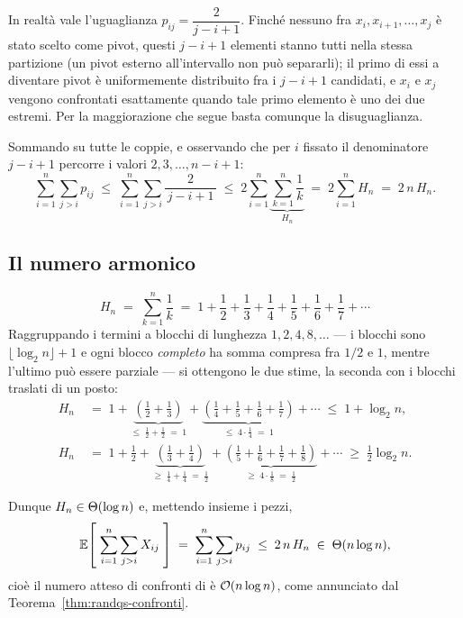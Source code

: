 \begin{osservazione}
In realtà vale l'uguaglianza $p_{ij} = \dfrac{2}{j-i+1}$. Finché nessuno fra
$x_i, x_{i+1},\dots,x_j$ è stato scelto come pivot, questi $j-i+1$ elementi
stanno tutti nella stessa partizione (un pivot esterno all'intervallo non può
separarli); il primo di essi a diventare pivot è uniformemente distribuito fra i
$j-i+1$ candidati, e $x_i$ e $x_j$ vengono confrontati esattamente quando tale
primo elemento è uno dei due estremi. Per la maggiorazione che segue basta
comunque la disuguaglianza.
\end{osservazione}

Sommando su tutte le coppie, e osservando che per $i$ fissato il denominatore
$j-i+1$ percorre i valori $2,3,\dots,n-i+1$:
\[
  \sum_{i=1}^{n}\sum_{j>i} p_{ij}
  \;\le\; \sum_{i=1}^{n}\sum_{j>i} \frac{2}{\,j-i+1\,}
  \;\le\; 2\sum_{i=1}^{n} \underbrace{\sum_{k=1}^{n}\frac{1}{k}}_{H_n}
  \;=\; 2\sum_{i=1}^{n} H_n
  \;=\; 2\,n\,H_n .
\]

\subsection{Il numero armonico}
\label{sec:numero-armonico}

\[
  H_n \;=\; \sum_{k=1}^{n}\frac1k
  \;=\; 1+\frac12+\frac13+\frac14+\frac15+\frac16+\frac17+\cdots
\]
Raggruppando i termini a blocchi di lunghezza $1,2,4,8,\dots$ --- i blocchi sono
$\lfloor\log_2 n\rfloor+1$ e ogni blocco \emph{completo} ha somma compresa fra
$1/2$ e $1$, mentre l'ultimo può essere parziale --- si ottengono le due stime,
la seconda con i blocchi traslati di un posto:
\begin{align*}
  H_n &\;=\; 1
    + \underbrace{\left(\frac12+\frac13\right)}_{\le\;\frac12+\frac12\;=\;1}
    + \underbrace{\left(\frac14+\frac15+\frac16+\frac17\right)}_{\le\;4\cdot\frac14\;=\;1}
    + \cdots \;\le\; 1+\log_2 n, \\[6pt]
  H_n &\;=\; 1+\frac12
    + \underbrace{\left(\frac13+\frac14\right)}_{\ge\;\frac14+\frac14\;=\;\frac12}
    + \underbrace{\left(\frac15+\frac16+\frac17+\frac18\right)}_{\ge\;4\cdot\frac18\;=\;\frac12}
    + \cdots \;\ge\; \frac12\log_2 n .
\end{align*}

Dunque $H_n \in \Theta(\log n)$ e, mettendo insieme i pezzi,
\[
  \mathbb{E}\!\left[\;\sum_{i=1}^{n}\sum_{j>i} X_{ij}\;\right]
  \;=\; \sum_{i=1}^{n}\sum_{j>i} p_{ij}
  \;\le\; 2\,n\,H_n \;\in\; \Theta(n\log n),
\]
cioè il numero atteso di confronti di \RandQS è $\mathcal{O}(n\log n)$, come annunciato
dal Teorema~\ref{thm:randqs-confronti}.

